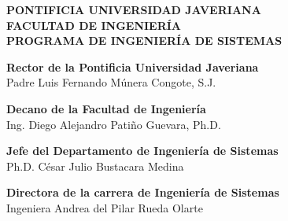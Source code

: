 \begin{center}

        \large
        \textbf{PONTIFICIA UNIVERSIDAD JAVERIANA} \\
        \textbf{FACULTAD DE INGENIERÍA} \\
        \textbf{PROGRAMA DE INGENIERÍA DE SISTEMAS} \\

        
        \vspace{0.5cm}
        \LARGE


        \vspace{8cm}

        \large
        \textbf{Rector de la Pontificia Universidad Javeriana}\\
        \vspace{0.5cm}
        Padre Luis Fernando Múnera Congote, S.J.\\
        \vspace{0.5cm}
        
        \textbf{Decano de la Facultad de Ingeniería}\\
        \vspace{0.5cm}
        Ing. Diego Alejandro Patiño Guevara, Ph.D.\\
        \vspace{0.5cm}
        
        \textbf{Jefe del Departamento de Ingeniería de Sistemas}\\
        \vspace{0.5cm}
        Ph.D. César Julio Bustacara Medina\\
        \vspace{0.5cm}

        \textbf{Directora de la carrera de Ingeniería de Sistemas}\\
        \vspace{0.5cm}
        Ingeniera Andrea del Pilar Rueda Olarte\\
        
    \end{center}
